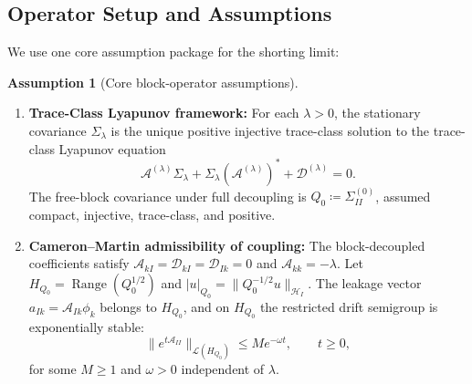 \documentclass[preprint,12pt]{elsarticle}
\theoremstyle{plain}
\theoremstyle{definition}
\newtheorem{assumption}[theorem]{Assumption}
\theoremstyle{remark}
\newcommand{\Range}{\operatorname{Range}}
\begin{document}
    \subsection{Operator Setup and Assumptions}
    \label{sec:setup:assumptions}

    We use one core assumption package for the shorting limit:

    \begin{assumption}[Core block-operator assumptions]
        \label{assum:core_analytical}
        \begin{enumerate}[label=(\roman*)]
            \item[(i)] \textbf{Trace-Class Lyapunov framework:} \label{assum:linear_second_moment}
            For each $\lambda>0$, the stationary covariance $\Sigma_\lambda$ is
            the unique positive injective trace-class solution to the trace-class
            Lyapunov equation
            \begin{equation}
                \label{eq:op_lyapunov}
                \mathcal{A}^{(\lambda)}\Sigma_\lambda + \Sigma_\lambda(\mathcal{A}^{(\lambda)})^* + \mathcal{D}^{(\lambda)} = 0.
            \end{equation}
            The free-block covariance under full decoupling is
            $Q_0\coloneqq\Sigma_{II}^{(0)}$, assumed compact, injective, trace-class,
            and positive.

            \item[(ii)] \textbf{Cameron--Martin admissibility of coupling:} \label{assum:cm_stability}
            The block-decoupled coefficients satisfy $\mathcal{A}_{kI}=\mathcal{D}_{kI}=\mathcal{D}_{Ik}=0$ and $\mathcal{A}_{kk}=-\lambda$.
            Let
            $H_{Q_0}=\Range(Q_0^{1/2})$ and
            $|u|_{Q_0}=\|Q_0^{-1/2}u\|_{\mathcal{H}_I}$. The leakage vector
            $a_{Ik}=\mathcal{A}_{Ik}\phi_k$ belongs to $H_{Q_0}$, and
            on $H_{Q_0}$ the restricted drift semigroup is exponentially stable:
            \begin{equation}
                \|e^{t\mathcal{A}_{II}}\|_{\mathcal{L}(H_{Q_0})} \le M e^{-\omega t},\qquad t\ge0,
            \end{equation}
            for some $M\ge1$ and $\omega>0$ independent of $\lambda$.
        \end{enumerate}
    \end{assumption}
\end{document}
